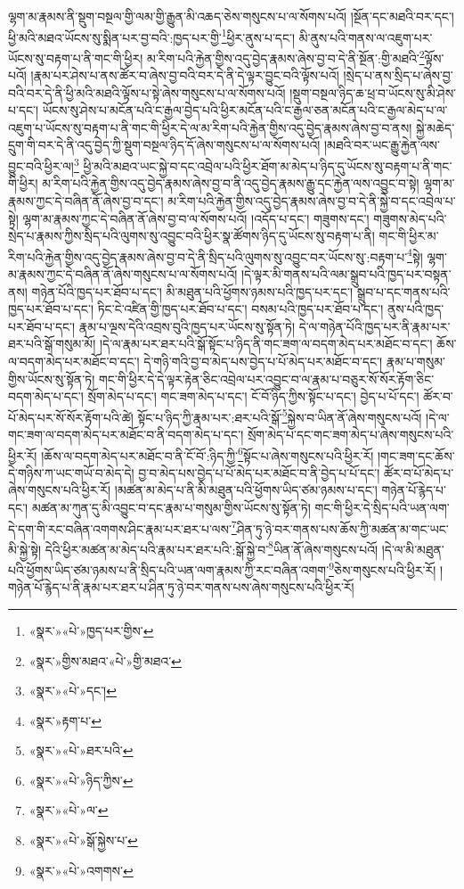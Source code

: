 ལྷག་མ་རྣམས་ནི་སྡུག་བསྔལ་གྱི་ལམ་གྱི་རྒྱུན་མི་འཆད་ཅེས་གསུངས་པ་ལ་སོགས་པའོ། །སྔོན་དང་མཐའི་བར་དང་། ཕྱི་མའི་མཐའ་ཡོངས་སུ་སྨིན་པར་བྱ་བའི་:ཁྱད་པར་གྱི་\footnote{«སྣར་»«པེ་»ཁྱད་པར་གྱིས་}ཕྱིར་ནུས་པ་དང་། མི་ནུས་པའི་གནས་ལ་འཇུག་པར་ཡོངས་སུ་བརྟག་པ་ནི་གང་གི་ཕྱིར། མ་རིག་པའི་རྐྱེན་གྱིས་འདུ་བྱེད་རྣམས་ཞེས་བྱ་བ་དེ་ནི་སྔོན་:གྱི་མཐའི་\footnote{«སྣར་»གྱིས་མཐའ་«པེ་»གྱི་མཐའ་}ལྟོས་པའོ། །རྣམ་པར་ཤེས་པ་ནས་ཚོར་བ་ཞེས་བྱ་བའི་བར་དེ་ནི་དེ་ལྟར་བྱུང་བའི་ལྟོས་པའོ། །སྲེད་པ་ནས་སྲིད་པ་ཞེས་བྱ་བའི་བར་དེ་ནི་ཕྱི་མའི་མཐའི་ལྟོས་པ་སྟེ་ཞེས་གསུངས་པ་ལ་སོགས་པའོ། །སྡུག་བསྔལ་ཉིད་ཆ་ཕྲ་བ་ཡོངས་སུ་མི་ཤེས་པ་དང་། ཡོངས་སུ་ཤེས་པ་མངོན་པའི་ང་རྒྱལ་བྱེད་པའི་ཕྱིར་མངོན་པའི་ང་རྒྱལ་ཅན་མངོན་པའི་ང་རྒྱལ་མེད་པ་ལ་འཇུག་པ་ཡོངས་སུ་བརྟག་པ་ནི་གང་གི་ཕྱིར་དེ་ལ་མ་རིག་པའི་རྐྱེན་གྱིས་འདུ་བྱེད་རྣམས་ཞེས་བྱ་བ་ནས། སྐྱེ་མཆེད་དྲུག་གི་བར་དེ་ནི་འདུ་བྱེད་ཀྱི་སྡུག་བསྔལ་ཉིད་དོ་ཞེས་གསུངས་པ་ལ་སོགས་པའོ། །མཐའི་བར་ཡང་རྒྱུ་རྐྱེན་ལས་བྱུང་བའི་ཕྱིར་ལ།\footnote{«སྣར་»«པེ་»དང་།} ཕྱི་མའི་མཐའ་ཡང་སྐྱེ་བ་དང་འབྲེལ་པའི་ཕྱིར་ཐོག་མ་མེད་པ་ཉིད་དུ་ཡོངས་སུ་བརྟག་པ་ནི་གང་གི་ཕྱིར། མ་རིག་པའི་རྐྱེན་གྱིས་འདུ་བྱེད་རྣམས་ཞེས་བྱ་བ་ནི་འདུ་བྱེད་རྣམས་རྒྱུ་དང་རྐྱེན་ལས་འབྱུང་བ་སྟེ། ལྷག་མ་རྣམས་ཀྱང་དེ་བཞིན་ནོ་ཞེས་བྱ་བ་དང་། མ་རིག་པའི་རྐྱེན་གྱིས་འདུ་བྱེད་རྣམས་ཞེས་བྱ་བ་དེ་ནི་སྐྱེ་བ་དང་འབྲེལ་པ་སྟེ། ལྷག་མ་རྣམས་ཀྱང་དེ་བཞིན་ནོ་ཞེས་བྱ་བ་ལ་སོགས་པའོ། །འདོད་པ་དང་། གཟུགས་དང་། གཟུགས་མེད་པའི་སྲེད་པ་རྣམས་ཀྱིས་སྲིད་པའི་ལུགས་སུ་འབྱུང་བའི་ཕྱིར་སྣ་ཚོགས་ཉིད་དུ་ཡོངས་སུ་བརྟག་པ་ནི། གང་གི་ཕྱིར་མ་རིག་པའི་རྐྱེན་གྱིས་འདུ་བྱེད་རྣམས་ཞེས་བྱ་བ་དེ་ནི་སྲིད་པའི་ལུགས་སུ་འབྱུང་བར་ཡོངས་སུ་:བརྟག་པ་\footnote{«སྣར་»རྟག་པ་}སྟེ། ལྷག་མ་རྣམས་ཀྱང་དེ་བཞིན་ནོ་ཞེས་གསུངས་པ་ལ་སོགས་པའོ། །དེ་ལྟར་མི་གནས་པའི་ལམ་སྒྲུབ་པའི་ཁྱད་པར་བསྟན་ནས། གཉེན་པོའི་ཁྱད་པར་ཐོབ་པ་དང་། མི་མཐུན་པའི་ཕྱོགས་ཉམས་པའི་ཁྱད་པར་དང་། སྒྲུབ་པ་དང་གནས་པའི་ཁྱད་པར་ཐོབ་པ་དང་། ཏིང་ངེ་འཛིན་གྱི་ཁྱད་པར་ཐོབ་པ་དང་། བསམ་པའི་ཁྱད་པར་ཐོབ་པ་དང་། ནུས་པའི་ཁྱད་པར་ཐོབ་པ་དང་། རྣམ་པ་ལྔས་དེའི་འབྲས་བུའི་ཁྱད་པར་ཡོངས་སུ་སྟོན་ཏེ། དེ་ལ་གཉེན་པོའི་ཁྱད་པར་ནི་རྣམ་པར་ཐར་པའི་སྒོ་གསུམ་མོ། །དེ་ལ་རྣམ་པར་ཐར་པའི་སྒོ་སྟོང་པ་ཉིད་ནི་གང་ཟག་ལ་བདག་མེད་པར་མཐོང་བ་དང་། ཆོས་ལ་བདག་མེད་པར་མཐོང་བ་དང་། དེ་གཉི་གའི་བྱ་བ་མེད་པས་བྱེད་པ་པོ་མེད་པར་མཐོང་བ་དང་། རྣམ་པ་གསུམ་གྱིས་ཡོངས་སུ་སྟོན་ཏེ། གང་གི་ཕྱིར་དེ་དེ་ལྟར་རྟེན་ཅིང་འབྲེལ་པར་འབྱུང་བ་ལ་རྣམ་པ་བཅུར་སོ་སོར་རྟོག་ཅིང་བདག་མེད་པ་དང་། སྲོག་མེད་པ་དང་། གང་ཟག་མེད་པ་དང་། ངོ་བོ་ཉིད་ཀྱིས་སྟོང་པ་དང་། བྱེད་པ་པོ་དང་། ཚོར་བ་པོ་མེད་པར་སོ་སོར་རྟོག་པའི་ཚེ། སྟོང་པ་ཉིད་ཀྱི་རྣམ་པར་:ཐར་པའི་སྒོ་\footnote{«སྣར་»«པེ་»ཐར་པའི་}སྐྱེས་བ་ཡིན་ནོ་ཞེས་གསུངས་པའོ། །དེ་ལ་གང་ཟག་ལ་བདག་མེད་པར་མཐོང་བ་ནི་བདག་མེད་པ་དང་། སྲོག་མེད་པ་དང་གང་ཟག་མེད་པ་ཞེས་གསུངས་པའི་ཕྱིར་རོ། །ཆོས་ལ་བདག་མེད་པར་མཐོང་བ་ནི་ངོ་བོ་:ཉིད་ཀྱི་\footnote{«སྣར་»«པེ་»ཉིད་ཀྱིས་}སྟོང་པ་ཞེས་གསུངས་པའི་ཕྱིར་རོ། །གང་ཟག་དང་ཆོས་དེ་གཉིས་ཀ་ཡང་གཡོ་བ་མེད་དེ། བྱ་བ་མེད་པས་བྱེད་པ་པོ་མེད་པར་མཐོང་བ་ནི་བྱེད་པ་པོ་དང་། ཚོར་བ་པོ་མེད་པ་ཞེས་གསུངས་པའི་ཕྱིར་རོ། །མཚན་མ་མེད་པ་ནི་མི་མཐུན་པའི་ཕྱོགས་ཡིད་ཙམ་ཉམས་པ་དང་། གཉེན་པོ་རྙེད་པ་དང་། མཚན་མ་ཀུན་དུ་མི་འབྱུང་བ་དང་རྣམ་པ་གསུམ་གྱིས་ཡོངས་སུ་སྟོན་ཏེ། གང་གི་ཕྱིར་དེ་སྲིད་པའི་ཡན་ལག་དེ་དག་གི་རང་བཞིན་འགགས་ཤིང་རྣམ་པར་ཐར་པ་ལས་\footnote{«སྣར་»«པེ་»ལ་}ཤིན་ཏུ་ཉེ་བར་གནས་པས་ཆོས་ཀྱི་མཚན་མ་གང་ཡང་མི་སྐྱེ་སྟེ། དེའི་ཕྱིར་མཚན་མ་མེད་པའི་རྣམ་པར་ཐར་པའི་:སྒོ་སྐྱེ་བ་\footnote{«སྣར་»«པེ་»སྒོ་སྐྱེས་པ་}ཡིན་ནོ་ཞེས་གསུངས་པའོ། །དེ་ལ་མི་མཐུན་པའི་ཕྱོགས་ཡིད་ཙམ་ཉམས་པ་ནི་སྲིད་པའི་ཡན་ལག་རྣམས་ཀྱི་རང་བཞིན་འགག་\footnote{«སྣར་»«པེ་»འགགས་}ཅེས་གསུངས་པའི་ཕྱིར་རོ། །གཉེན་པོ་རྙེད་པ་ནི་རྣམ་པར་ཐར་པ་ཤིན་ཏུ་ཉེ་བར་གནས་པས་ཞེས་གསུངས་པའི་ཕྱིར་རོ། 
